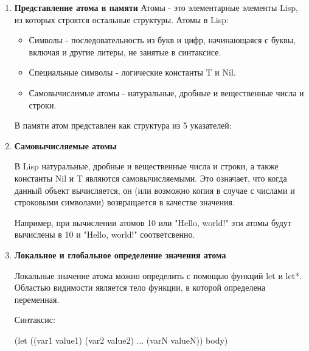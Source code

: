 \begin{enumerate}
\item \textbf{Представление атома в памяти}
Атомы - это элементарные элементы Lisp, из которых строятся остальные структуры.
Атомы в Lisp:
\begin{itemize}
\item Символы - последовательность из букв и цифр, начинающаяся с буквы, включая и другие литеры, не занятые в синтаксисе.
\item Специальные символы - логические константы T и Nil.
\item Самовычислимые атомы - натуральные, дробные и вещественные числа и строки.
\end{itemize}

В памяти атом представлен как структура из 5 указателей:
\begin{figure}[ht!]
\end{figure}

\item \textbf{Самовычисляемые атомы}

В Lisp натуральные, дробные и вещественные числа и строки, а также константы Nil и T являются самовычисляемыми.
Это означает, что когда данный объект вычисляется, он (или возможно копия в случае с числами и строковыми символами) возвращается в качестве значения.

Например, при вычислении атомов 10 или "Hello, world!"  эти атомы будут вычислены в 10 и "Hello, world!" соответсвенно.

\item \textbf{Локальное и глобальное определение значения атома}

Локальные значение атома можно определить с помощью функций let и let*. Областью видимости является тело функции, в которой определена переменная.

Синтаксис:

(let ((var1 value1) (var2 value2) ... (varN valueN)) body)


\end{enumerate}
